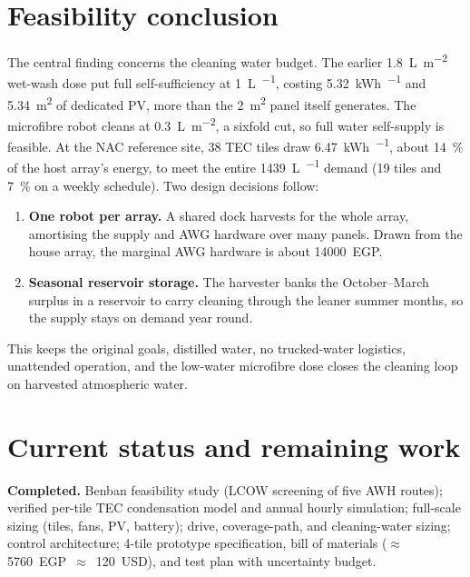 \documentclass[11pt,a4paper]{article}
\begin{document}
\section{Feasibility conclusion}
\label{sec:feasibility}

The central finding concerns the cleaning water budget. The earlier
\SI{1.8}{\liter\per\square\meter} wet-wash dose put full self-sufficiency at
\SI{1}{\liter\per\dy}, costing \SI{5.32}{\kWh\per\dy} and
\SI{5.34}{\square\meter} of dedicated PV, more than the
\SI{2}{\square\meter} panel itself generates. The microfibre robot cleans
at \SI{0.3}{\liter\per\square\meter}, a sixfold cut, so full water self-supply is
feasible. At the NAC reference site, 38 TEC tiles draw
\SI{6.47}{\kWh\per\dy}, about \SI{14}{\percent} of the host array's energy,
to meet the entire \SI{1439}{\liter\per\year} demand (19 tiles and
\SI{7}{\percent} on a weekly schedule). Two design decisions follow:

\begin{enumerate}
  \item \textbf{One robot per array.} A shared dock harvests for the whole
        array, amortising the supply and AWG hardware over many panels. Drawn
        from the house array, the marginal AWG hardware is about
        \num{14000}~EGP.
  \item \textbf{Seasonal reservoir storage.} The harvester banks the
        October--March surplus in a reservoir to carry cleaning through the
        leaner summer months, so the supply stays on demand year round.
\end{enumerate}

This keeps the original goals, distilled water, no trucked-water
logistics, unattended operation, and the low-water microfibre dose closes
the cleaning loop on harvested atmospheric water.

\section{Current status and remaining work}
\label{sec:status}

\textbf{Completed.} Benban feasibility study (LCOW screening of five AWH
routes); verified per-tile TEC condensation model and annual hourly
simulation; full-scale sizing (tiles, fans, PV, battery); drive,
coverage-path, and cleaning-water sizing; control architecture; 4-tile
prototype specification, bill of materials
($\approx$\,\num{5760}~EGP~$\approx$~\num{120}~USD), and test plan with
uncertainty budget.
\end{document}
